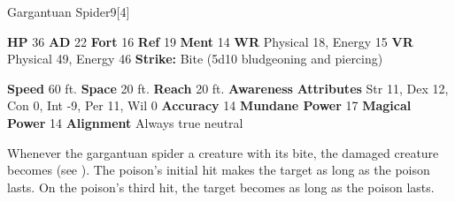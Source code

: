   \begin{monsubsection}{Gargantuan Spider}{9}[4]
    \vspace{-1em}\vspace{-1em}
    \vspace{0em}

    
    

    \begin{spellcontent}
      \begin{spelltargetinginfo}
        \pari \textbf{HP} 36 \monsep
          \textbf{AD} 22 \monsep
          \textbf{Fort} 16 \monsep
          \textbf{Ref} 19 \monsep
          \textbf{Ment} 14
        \pari \textbf{WR} Physical 18, Energy 15 \monsep
        \textbf{VR} Physical 49, Energy 46
        \pari \textbf{Strike:}
            Bite  (5d10 bludgeoning and piercing)
      \end{spelltargetinginfo}
    \end{spellcontent}
    \begin{monsterfooter}
      \pari \textbf{Speed} 60 ft. \monsep
        \textbf{Space} 20 ft. \monsep
        \textbf{Reach} 20 ft.
      \pari \textbf{Awareness} 
      \pari \textbf{Attributes}
        Str 11, Dex 12,
        Con 0, Int -9,
        Per 11, Wil 0
      \pari \textbf{Accuracy} 14 \monsep
        \textbf{Mundane Power} 17 \monsep
      \textbf{Magical Power} 14
      \pari \textbf{Alignment} Always true neutral
    \end{monsterfooter}
  \end{monsubsection}
        Whenever the gargantuan spider  a creature with its bite,
          the damaged creature becomes  (see ).
        The poison's initial hit makes the target  as long as the poison lasts.
        On the poison's third hit, the target becomes  as long as the poison lasts.
  

